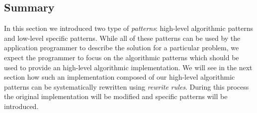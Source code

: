 \subsection{Summary}
In this section we introduced two type of \emph{patterns}:
high-level algorithmic patterns and low-level \OpenCL specific patterns.
While all of these patterns can be used by the application programmer to describe the solution for a particular problem, we expect the programmer to focus on the algorithmic patterns which should be used to provide an high-level algorithmic implementation.
We will see in the next section how such an implementation composed of our high-level algorithmic patterns can be systematically rewritten using \emph{rewrite rules}.
During this process the original implementation will be modified and \OpenCL specific patterns will be introduced.

















